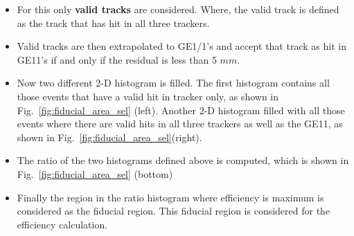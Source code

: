 \begin{itemize}
        \item For this only \textbf{valid tracks} are considered. Where, the valid track is defined as the track that has hit in all three trackers.
        \item Valid tracks are then extrapolated to GE1/1’s and accept that track as hit in GE11’s if and only if the residual is less than 5 $mm$.
        \item Now two different 2-D histogram is filled. The first histogram contains all those events that have a valid hit in tracker only, as shown in Fig.~\ref{fig:fiducial_area_sel} (left). Another 2-D histogram filled with all those events where there are valid hits in all three trackers as well as the GE11, as shown in Fig.~\ref{fig:fiducial_area_sel}(right).
        \item The ratio of the two histograms defined above is computed, which is shown in Fig.~\ref{fig:fiducial_area_sel} (bottom)
        \item Finally the region in the ratio histogram where efficiency is maximum is considered as the fiducial region. This fiducial region is considered for the efficiency calculation.
\end{itemize}
